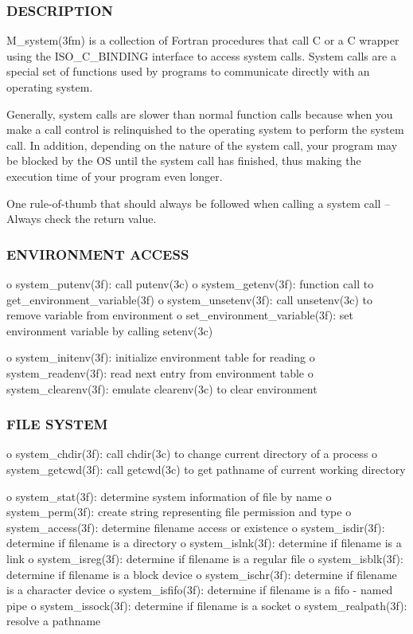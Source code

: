 \subsubsection*{D\+E\+S\+C\+R\+I\+P\+T\+I\+ON}

M\+\_\+system(3fm) is a collection of Fortran procedures that call C or a C wrapper using the I\+S\+O\+\_\+\+C\+\_\+\+B\+I\+N\+D\+I\+NG interface to access system calls. System calls are a special set of functions used by programs to communicate directly with an operating system.

Generally, system calls are slower than normal function calls because when you make a call control is relinquished to the operating system to perform the system call. In addition, depending on the nature of the system call, your program may be blocked by the OS until the system call has finished, thus making the execution time of your program even longer.

One rule-\/of-\/thumb that should always be followed when calling a system call -- Always check the return value. \subsubsection*{E\+N\+V\+I\+R\+O\+N\+M\+E\+NT A\+C\+C\+E\+SS}

o system\+\_\+putenv(3f)\+: call putenv(3c) o system\+\_\+getenv(3f)\+: function call to get\+\_\+environment\+\_\+variable(3f) o system\+\_\+unsetenv(3f)\+: call unsetenv(3c) to remove variable from environment o set\+\_\+environment\+\_\+variable(3f)\+: set environment variable by calling setenv(3c)

o system\+\_\+initenv(3f)\+: initialize environment table for reading o system\+\_\+readenv(3f)\+: read next entry from environment table o system\+\_\+clearenv(3f)\+: emulate clearenv(3c) to clear environment \subsubsection*{F\+I\+LE S\+Y\+S\+T\+EM}

o system\+\_\+chdir(3f)\+: call chdir(3c) to change current directory of a process o system\+\_\+getcwd(3f)\+: call getcwd(3c) to get pathname of current working directory

o system\+\_\+stat(3f)\+: determine system information of file by name o system\+\_\+perm(3f)\+: create string representing file permission and type o system\+\_\+access(3f)\+: determine filename access or existence o system\+\_\+isdir(3f)\+: determine if filename is a directory o system\+\_\+islnk(3f)\+: determine if filename is a link o system\+\_\+isreg(3f)\+: determine if filename is a regular file o system\+\_\+isblk(3f)\+: determine if filename is a block device o system\+\_\+ischr(3f)\+: determine if filename is a character device o system\+\_\+isfifo(3f)\+: determine if filename is a fifo -\/ named pipe o system\+\_\+issock(3f)\+: determine if filename is a socket o system\+\_\+realpath(3f)\+: resolve a pathname

